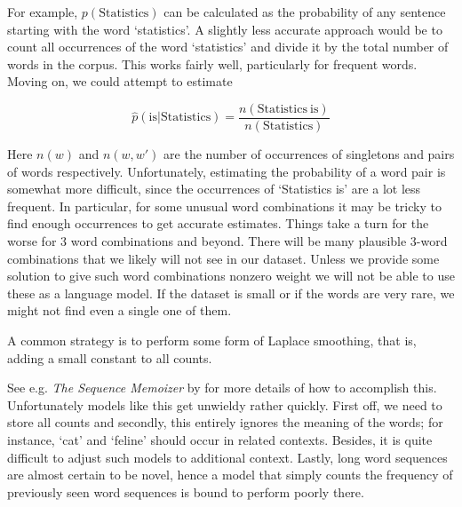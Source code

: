 For example, $p(\mathrm{Statistics})$ can be calculated as the probability of any sentence starting with the word ‘statistics’. A slightly less accurate approach would be to count all occurrences of the word ‘statistics’ and divide it by the total number of words in the corpus. This works fairly well, particularly for frequent words. Moving on, we could attempt to estimate

$$\hat{p}(\mathrm{is}|\mathrm{Statistics}) = \frac{n(\mathrm{Statistics~is})}{n(\mathrm{Statistics})}$$

Here $n(w)$ and $n(w, w')$ are the number of occurrences of singletons and pairs of words respectively. Unfortunately, estimating the probability of a word pair is somewhat more difficult, since the occurrences of ‘Statistics is’ are a lot less frequent. In particular, for some unusual word combinations it may be tricky to find enough occurrences to get accurate estimates. Things take a turn for the worse for 3 word combinations and beyond. There will be many plausible 3-word combinations that we likely will not see in our dataset. Unless we provide some solution to give such word combinations nonzero weight we will not be able to use these as a language model. If the dataset is small or if the words are very rare, we might not find even a single one of them.

A common strategy is to perform some form of Laplace smoothing, that is, adding a small constant to all counts. 



See e.g. \textit{The Sequence Memoizer} by \citep{Wood2011} for more details of how to accomplish this. Unfortunately models like this get unwieldy rather quickly. First off, we need to store all counts and secondly, this entirely ignores the meaning of the words; for instance, ‘cat’ and ‘feline’ should occur in related contexts. Besides, it is quite difficult to adjust such models to additional context. Lastly, long word sequences are almost certain to be novel, hence a model that simply counts the frequency of previously seen word sequences is bound to perform poorly there.

